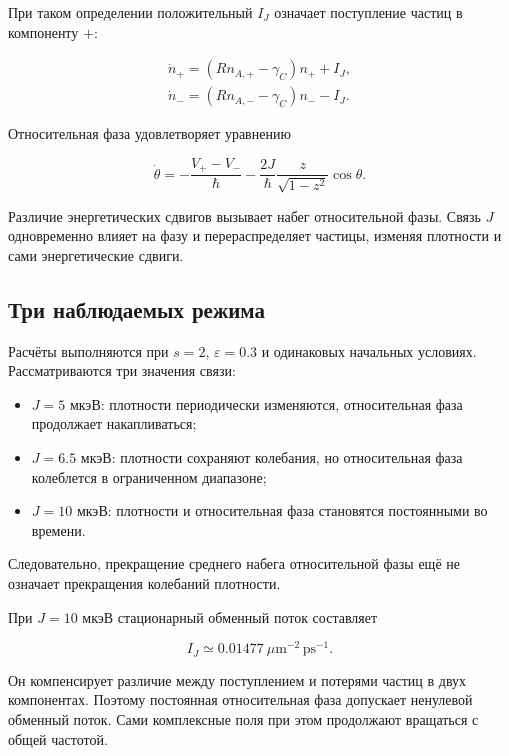 \documentclass[12pt,a4paper]{article}
\begin{document}
При таком определении положительный \(I_J\) означает поступление частиц в компоненту \(+\):

\begin{equation}\label{eq:10}
\begin{gathered}
\dot n_+=(Rn_{A,+}-\gamma_C)n_+ + I_J,\\[0.5em]
\dot n_-=(Rn_{A,-}-\gamma_C)n_- - I_J.
\end{gathered}
\end{equation}

Относительная фаза удовлетворяет уравнению

\begin{equation}\label{eq:11}
\dot\theta
=
-\frac{V_+-V_-}{\hbar}
-\frac{2J}{\hbar}
\frac{z}{\sqrt{1-z^2}}\cos\theta.
\end{equation}

Различие энергетических сдвигов вызывает набег относительной фазы. Связь \(J\) одновременно влияет на фазу и перераспределяет частицы, изменяя плотности и сами энергетические сдвиги.

\subsection{Три наблюдаемых режима}\label{sec:3.2}

Расчёты выполняются при \(s=2\), \(\varepsilon=0.3\) и одинаковых начальных условиях. Рассматриваются три значения связи:

\begin{itemize}\setlength{\itemsep}{3pt}
\item \(J=5\) мкэВ: плотности периодически изменяются, относительная фаза продолжает накапливаться;
\item \(J=6.5\) мкэВ: плотности сохраняют колебания, но относительная фаза колеблется в ограниченном диапазоне;
\item \(J=10\) мкэВ: плотности и относительная фаза становятся постоянными во времени.
\end{itemize}

Следовательно, прекращение среднего набега относительной фазы ещё не означает прекращения колебаний плотности.

При \(J=10\) мкэВ стационарный обменный поток составляет

\[
I_J\simeq0.01477\ \mu\mathrm m^{-2}\,\mathrm{ps}^{-1}.
\]

Он компенсирует различие между поступлением и потерями частиц в двух компонентах. Поэтому постоянная относительная фаза допускает ненулевой обменный поток. Сами комплексные поля при этом продолжают вращаться с общей частотой.
\end{document}
